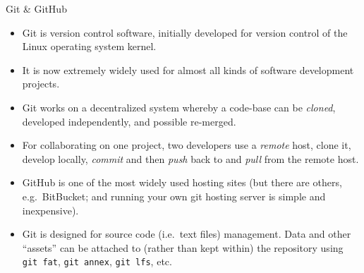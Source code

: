 \documentclass[10pt,ignorenonframetext,]{beamer}
\providecommand{\tightlist}{%
  \setlength{\itemsep}{0pt}\setlength{\parskip}{0pt}}
\begin{document}
\begin{frame}[fragile]{Git \& GitHub}
\protect\hypertarget{git-github}{}

\begin{itemize}
\tightlist
\item
  Git is version control software, initially developed for version
  control of the Linux operating system kernel.
\item
  It is now extremely widely used for almost all kinds of software
  development projects.
\item
  Git works on a decentralized system whereby a code-base can be
  \emph{cloned}, developed independently, and possible re-merged.
\item
  For collaborating on one project, two developers use a \emph{remote}
  host, clone it, develop locally, \emph{commit} and then \emph{push}
  back to and \emph{pull} from the remote host.
\item
  GitHub is one of the most widely used hosting sites (but there are
  others, e.g.~BitBucket; and running your own git hosting server is
  simple and inexpensive).
\item
  Git is designed for source code (i.e.~text files) management. Data and
  other “assets” can be attached to (rather than kept within) the
  repository using \texttt{git\ fat}, \texttt{git\ annex},
  \texttt{git\ lfs}, etc.
\end{itemize}

\end{frame}
\end{document}
